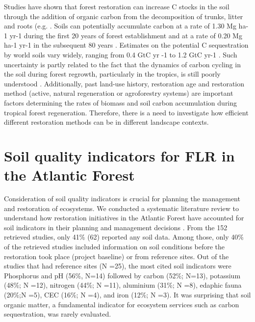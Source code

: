 	Studies have shown that forest restoration can increase C stocks in the soil through the addition of organic carbon from the decomposition of trunks, litter and roots (e.g. \citep{Macedo2008ChangesTrees, RodriguesNogueiraJr.2011SoilSpecies, Xu2018EffectsChina}. Soils can potentially accumulate carbon at a rate of 1.30 Mg ha-1 yr-1 during the first 20 years of forest establishment and at a rate of 0.20 Mg ha-1 yr-1 in the subsequent 80 years \citep{Silver2000TheLands}. Estimates on the potential C sequestration by world soils vary widely, ranging from 0.4 GtC yr -1 to 1.2 GtC yr-1 \citep{Sauerbeck2001CO2emissionsLimitations, Lal2004SoilSecurity}. Such uncertainty is partly related to the fact that the dynamics of carbon cycling in the soil during forest regrowth, particularly in the tropics, is still poorly understood \citep{Ritchie2014PlantGrassland, Wang2016DynamicsChina, Xu2018EffectsChina}. Additionally, past land-use history, restoration age and restoration method (active, natural regeneration or agroforestry systems) are important factors determining the rates of biomass and soil carbon accumulation during tropical forest regeneration. Therefore, there is a need to investigate how efficient different restoration methods can be in different landscape contexts. 


\section{\Large Soil quality indicators for FLR in the Atlantic Forest}  \label{sec:car-air}

Consideration of soil quality indicators is crucial for planning the management and restoration of ecosystems. We conducted a systematic literature review to understand how restoration initiatives in the Atlantic Forest have accounted for soil indicators in their planning and management decisions \citep{Mendes2018}. From the 152 retrieved studies, only 41\% (62) reported any soil data. Among those, only 40\% of the retrieved studies included information on soil conditions before the restoration took place (project baseline) or from reference sites. Out of the studies that had reference sites (N =25), the most cited soil indicators were Phosphorus and pH (56\%, N=14) followed by carbon (52\%; N=13), potassium (48\%; N =12), nitrogen (44\%; N =11), aluminium (31\%; N =8), edaphic fauna (20\%;N =5), CEC (16\%; N =4), and iron (12\%; N =3). It was surprising that soil organic matter, a fundamental indicator for ecosystem services such as carbon sequestration, was rarely evaluated. 

